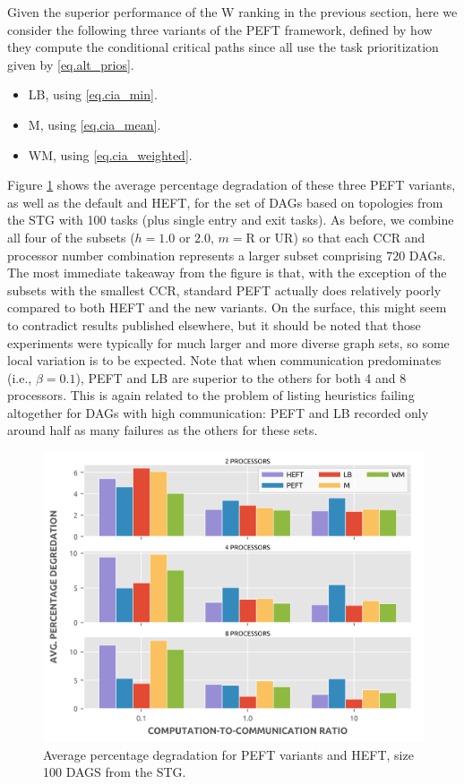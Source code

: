 \documentclass[12pt]{article}
\begin{document}
Given the superior performance of the W ranking in the previous section, here we consider the following three variants of the PEFT framework, defined by how they compute the conditional critical paths since all use the task prioritization given by \eqref{eq.alt_prios}.
\begin{itemize}
	\item LB, using \eqref{eq.cia_min}.
	\item M, using \eqref{eq.cia_mean}.
	\item WM, using \eqref{eq.cia_weighted}.
\end{itemize}
Figure \ref{plot.selection_apd_100} shows the average percentage degradation of these three PEFT variants, as well as the default and HEFT, for the set of DAGs based on topologies from the STG with 100 tasks (plus single entry and exit tasks). As before, we combine all four of the subsets ($h = 1.0$ or $2.0$, $m = \text{R}$ or UR) so that each CCR and processor number combination represents a larger subset comprising $720$ DAGs. The most immediate takeaway from the figure is that, with the exception of the subsets with the smallest CCR, standard PEFT actually does relatively poorly compared to both HEFT and the new variants. On the surface, this might seem to contradict results published elsewhere, but it should be noted that those experiments were typically for much larger and more diverse graph sets, so some local variation is to be expected. Note that when communication predominates (i.e., $\beta = 0.1$), PEFT and LB are superior to the others for both 4 and 8 processors. This is again related to the problem of listing heuristics failing altogether for DAGs with high communication: PEFT and LB recorded only around half as many failures as the others for these sets.  

\begin{figure}
	\centering	
	\includegraphics[scale=0.8]{100tasks_apd.png}
	\caption{Average percentage degradation for PEFT variants and HEFT, size 100 DAGS from the STG.}	
	\label{plot.selection_apd_100}
\end{figure}
\end{document}
